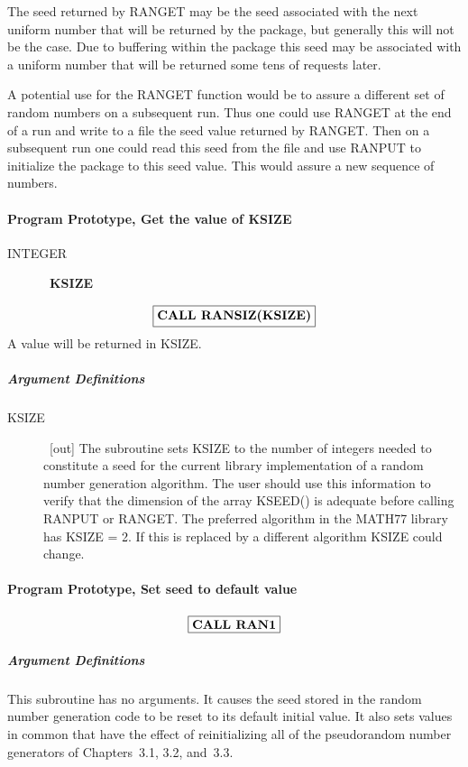 \documentclass[twoside]{MATH77}
\begin{document}
The seed returned by RANGET may be the seed associated with the next uniform
number that will be returned by the package, but generally this will not be
the case. Due to buffering within the package this seed may be associated
with a uniform number that will be returned some tens of requests later.

A potential use for the RANGET function would be to assure a different set
of random numbers on a subsequent run. Thus one could use RANGET at the end
of a run and write to a file the seed value returned by RANGET. Then on a
subsequent run one could read this seed from the file and use RANPUT to
initialize the package to this seed value. This would assure a new sequence
of numbers.

\paragraph{Program Prototype, Get the value of KSIZE}

\begin{description}
\item[INTEGER]  \ {\bf KSIZE}
\end{description}
$$
\fbox{{\bf CALL RANSIZ(KSIZE)}}
$$
A value will be returned in KSIZE.

\subparagraph{Argument Definitions}

\begin{description}
\item[KSIZE]  \ [out] The subroutine sets KSIZE to the number of integers
needed to constitute a seed for the current library implementation of a
random number generation algorithm. The user should use this information to
verify that the dimension of the array KSEED() is adequate before calling
RANPUT or RANGET. The preferred algorithm in the MATH77 library has KSIZE =
2. If this is replaced by a different algorithm KSIZE could change.
\end{description}

\paragraph{Program Prototype, Set seed to default value}\vspace{-10pt}
$$
\fbox{{\bf CALL RAN1}}
$$
\subparagraph{Argument Definitions}

This subroutine has no arguments. It causes the seed stored in the random
number generation code to be reset to its default initial value. It also
sets values in common that have the effect of reinitializing all of the
pseudorandom number generators of Chapters~3.1, 3.2, and~3.3.
\end{document}
